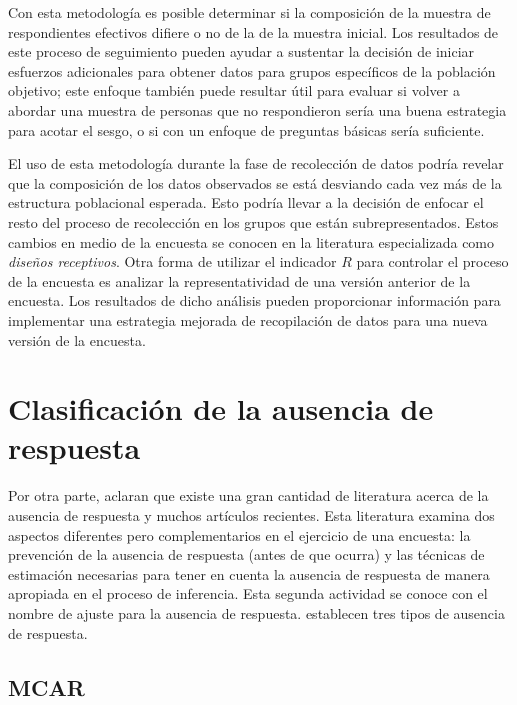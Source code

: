 \documentclass[
  12pt,
]{book}
\begin{document}
Con esta metodología es posible determinar si la composición de la muestra de respondientes efectivos difiere o no de la de la muestra inicial. Los resultados de este proceso de seguimiento pueden ayudar a sustentar
la decisión de iniciar esfuerzos adicionales para obtener datos para grupos específicos de la población objetivo; este enfoque también puede resultar útil para evaluar si volver a abordar una muestra de personas que no respondieron sería una buena estrategia para acotar el sesgo, o si con un enfoque de preguntas básicas sería suficiente.

El uso de esta metodología durante la fase de recolección de datos podría revelar que la composición de los datos observados se está desviando cada vez más de la estructura poblacional esperada. Esto podría llevar a la decisión de enfocar el resto del proceso de recolección en los grupos que están subrepresentados. Estos cambios en medio de la encuesta se conocen en la literatura especializada como \emph{diseños receptivos}. Otra forma de utilizar el indicador \(R\) para controlar el proceso de la encuesta es analizar la representatividad de una versión anterior de la encuesta. Los resultados de dicho análisis pueden proporcionar información para implementar una estrategia mejorada de recopilación de datos para una nueva versión de la encuesta.

\hypertarget{clasificaciuxf3n-de-la-ausencia-de-respuesta}{%
\section{Clasificación de la ausencia de respuesta}\label{clasificaciuxf3n-de-la-ausencia-de-respuesta}}

Por otra parte, \citet{Lund} aclaran que existe una gran cantidad de literatura acerca de la ausencia de respuesta y muchos artículos recientes. Esta literatura examina dos aspectos diferentes pero complementarios en el ejercicio de una encuesta: la prevención de la ausencia de respuesta (antes de que ocurra) y las técnicas de estimación necesarias para tener en cuenta la ausencia de respuesta de manera apropiada en el proceso de inferencia. Esta segunda actividad se conoce con el nombre de ajuste para la ausencia de respuesta. \citet{LR2002} establecen tres tipos de ausencia de respuesta.

\hypertarget{mcar}{%
\subsection{MCAR}\label{mcar}}
\end{document}
